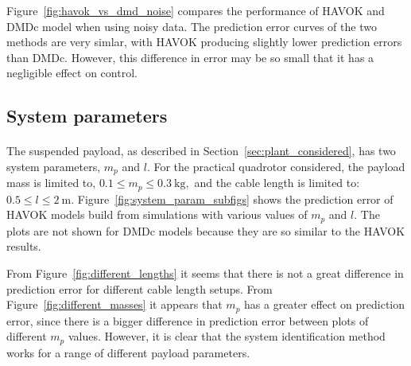         

        Figure~\ref{fig:havok_vs_dmd_noise} compares the performance of HAVOK and DMDc model when using noisy data.
        The prediction error curves of the two methods are very simlar, with HAVOK producing slightly lower prediction errors than DMDc.
        However, this difference in error may be so small that it has a negligible effect on control.  

    \subsection{System parameters}
            
        \paragraph{}
        The suspended payload, as described in Section~\ref{sec:plant_considered},
        has two system parameters, $m_p$ and $l$.
        For the practical quadrotor considered, the payload mass is limited to,
        $
            0.1 \leq m_p \leq \SI{0.3}{\kilo\gram} ,
        $
        and the cable length is limited to:
        $
            0.5 \leq l \leq \SI{2}{\metre} .
        $
        Figure~\ref{fig:system_param_subfigs} shows the prediction error of HAVOK models 
        build from simulations with various values of $m_p$ and $l$.
        The plots are not shown for DMDc models because they are so similar to the HAVOK results.

        

        From Figure~\ref{fig:different_lengths} it seems that there is not a great difference in prediction error 
        for different cable length setups.
        From Figure~\ref{fig:different_masses} it appears that $m_p$ has a greater effect on prediction error,
        since there is a bigger difference in prediction error between plots of different $m_p$ values.
        However, it is clear that the system identification method works for a range of different payload parameters.


